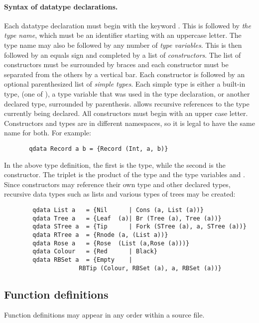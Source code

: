 \paragraph{Syntax of datatype declarations.}
Each datatype declaration must begin with the keyword . This is
followed by \emph{the type name}, which must be an identifier 
starting with an uppercase letter. The type name may also be followed by
 any number of \emph{type variables}.
This is then followed by an equals sign
and   completed by a list of \emph{constructors}. The list of constructors
must be surrounded by 
braces and each constructor must be separated from the others 
by a vertical bar. Each constructor is followed by an optional parenthesized
list of \emph{simple types}. 
Each simple type is either a built-in type, (one of 
), a type variable that was used in the
type declaration, or another declared type, surrounded by 
parenthesis. \lqpl{} allows recursive
references to the type currently being declared. All constructors must
begin with an upper case letter. Constructors and types are in different
namespaces, so it is legal to have the same name for both. For example:
\begin{lstlisting}
       qdata Record a b = {Record (Int, a, b)}
\end{lstlisting}
In the above type definition,
 the first  is the type, while the second is the 
constructor. The triplet  is the product of the
type  and the type variables  and .
Since constructors may reference their own type and other 
declared types, recursive 
data types such as lists and various types of
 trees may be created:

\begin{lstlisting}
        qdata List a   = {Nil      | Cons (a, List (a))}
        qdata Tree a   = {Leaf  (a)| Br (Tree (a), Tree (a))}
        qdata STree a  = {Tip      | Fork (STree (a), a, STree (a))}
        qdata RTree a  = {Rnode (a, (List a))}
        qdata Rose a   = {Rose  (List (a,Rose (a)))} 
        qdata Colour   = {Red      | Black}
        qdata RBSet a  = {Empty    |
	                 RBTip (Colour, RBSet (a), a, RBSet (a))}
\end{lstlisting}
\subsection{Function definitions}\label{subsec:functiondefinitions}
Function definitions may appear in any order within a
\lqpl{} source file. 
